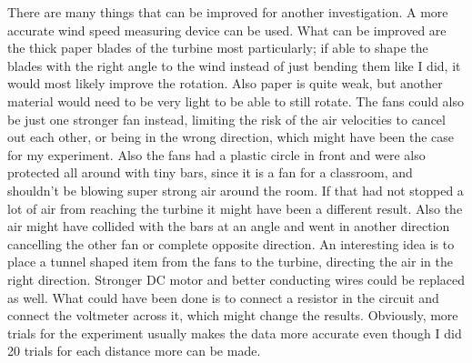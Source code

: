 \documentclass[12pt]{article}
\begin{document}
There are many things that can be improved for another investigation.
A more accurate wind speed measuring device can be used.
What can be improved are the thick paper blades of the turbine most particularly; if able to shape the blades with the right angle to the wind instead of just bending them like I did, it would most likely improve the rotation.
Also paper is quite weak, but another material would need to be very light to be able to still rotate.
The fans could also be just one stronger fan instead, limiting the risk of the air velocities to cancel out each other, or being in the wrong direction, which might have been the case for my experiment.
Also the fans had a plastic circle in front and were also protected all around with tiny bars, since it is a fan for a classroom, and shouldn't be blowing super strong air around the room.
If that had not stopped a lot of air from reaching the turbine it might have been a different result.
Also the air might have collided with the bars at an angle and went in another direction cancelling the other fan or complete opposite direction.
An interesting idea is to place a tunnel shaped item from the fans to the turbine, directing the air in the right direction.
Stronger DC motor and better conducting wires could be replaced as well.
What could have been done is to connect a resistor in the circuit and connect the voltmeter across it, which might change the results.
Obviously, more trials for the experiment usually makes the data more accurate even though I did 20 trials for each distance more can be made.




\nocite{*}





\end{document}
